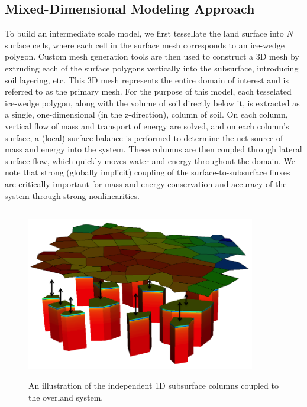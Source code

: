 \documentclass[review]{elsarticle}
\begin{document}
\subsection{Mixed-Dimensional Modeling Approach}
To build an intermediate scale model, we first tessellate the land surface into $N$ surface cells, where each cell in the surface mesh corresponds to an ice-wedge polygon.
Custom mesh generation tools are then used to construct a 3D mesh by extruding each of the surface polygons vertically into the subsurface, introducing soil layering, etc.
This 3D mesh represents the entire domain of interest and is referred to as the primary mesh.
For the purpose of this model, each tesselated ice-wedge polygon, along with the volume of soil directly below it, is extracted as a single, one-dimensional (in the z-direction), column of soil.
On each column, vertical flow of mass and transport of energy are solved, and on each column's surface, a (local) surface balance is performed to determine the net source of mass and energy into the system.
These columns are then coupled through lateral surface flow, which quickly moves water and energy throughout the domain.
We note that strong (globally implicit) coupling of the surface-to-subsurface fluxes are critically important for mass and energy conservation and accuracy of the system through strong nonlinearities.
%
\begin{figure}[!htpb]
\centering
\includegraphics[height = 7.5cm, width=10cm]{figures/mixed-dim-model.png}
\caption{An illustration of the independent 1D subsurface columns coupled to the overland system.}
\label{surf-cols}
\end{figure}
\end{document}
